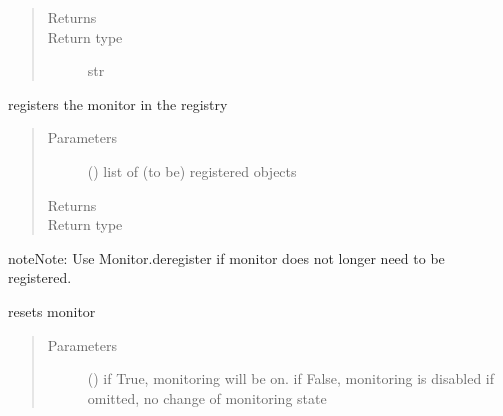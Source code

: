 \documentclass[letterpaper,10pt,english]{sphinxmanual}
\begin{document}
\begin{fulllineitems}
\begin{fulllineitems}
\begin{quote}
\begin{description}
\begin{itemize}
\end{itemize}

\item[{Returns}] \leavevmode
{}

\item[{Return type}] \leavevmode
str

\end{description}\end{quote}

\end{fulllineitems}


\begin{fulllineitems}
\label{\detokenize{Reference:salabim.Monitor.register}}
registers the monitor in the registry
\begin{quote}\begin{description}
\item[{Parameters}] \leavevmode
{} () \textendash{} list of (to be) registered objects

\item[{Returns}] \leavevmode
{}

\item[{Return type}] \leavevmode
{\hyperref[\detokenize{Reference:salabim.Monitor}]{}}

\end{description}\end{quote}

\begin{sphinxadmonition}{note}{Note:}
Use Monitor.deregister if monitor does not longer need to be registered.
\end{sphinxadmonition}

\end{fulllineitems}


\begin{fulllineitems}
\label{\detokenize{Reference:salabim.Monitor.reset}}
resets monitor
\begin{quote}\begin{description}
\item[{Parameters}] \leavevmode
{} () \textendash{} if True, monitoring will be on. 
if False, monitoring is disabled
if omitted, no change of monitoring state


\end{description}
\end{quote}
\end{fulllineitems}
\end{fulllineitems}
\end{document}
